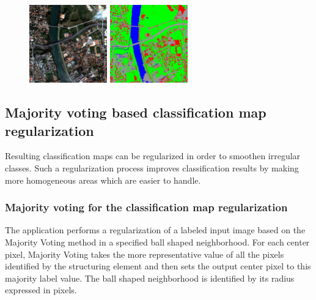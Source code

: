 \begin{figure}[!h]
  \center
  \includegraphics[width=0.3\textwidth]{../Art/MonteverdiImages/classification_chain_inputimage.jpg}
  \includegraphics[width=0.3\textwidth]{../Art/MonteverdiImages/classification_chain_fancyclassif_CMR_Fusion_123.png}
  \label{fig:ClassificationMapFusionApplication2}
\end{figure}






\subsection{Majority voting based classification map regularization}\label{ssec:classificationmapregularization}

Resulting classification maps can be regularized in order to smoothen irregular classes. Such a regularization process
improves classification results by making more homogeneous areas which are easier to handle.

\subsubsection{Majority voting for the classification map regularization}

The  application performs a regularization of a labeled input image
based on the Majority Voting method in a specified ball shaped neighborhood. For each center pixel, Majority Voting takes the
more representative value of all the pixels identified by the structuring element and then sets the output center pixel
to this majority label value. The ball shaped neighborhood is identified by its radius expressed in pixels.


